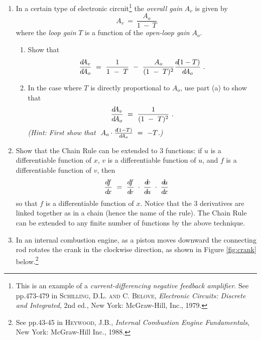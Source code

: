 {\begin{enumerate}[\bfseries 1.]
[{[\bfseries 1.]}]
 \item In a certain type of electronic circuit\footnote{This is an example of a
  \emph{current-differencing negative feedback amplifier}. See pp.473-479 in
  \textsc{Schilling, D.L. and C. Belove}, \emph{Electronic Circuits: Discrete and Integrated},
  2nd ed., New York: McGraw-Hill, Inc., 1979.} the \emph{overall gain} $A_v$ is given by
  \begin{displaymath}
   A_v ~=~ \frac{A_o}{1 ~-~ T}
  \end{displaymath}
  where the \emph{loop gain} $T$ is a function of the \emph{open-loop gain} $A_o$.
  \begin{enumerate}[\bfseries (a)]
   \item Show that
    \begin{displaymath}
     \frac{d \negmedspace A_v}{d\!A_o} ~=~ \frac{1}{1 ~-~ T} ~-~ \frac{A_o}{(1 ~-~ T)^2}
                                           \frac{d \negmedspace (1 - T)}{d\!A_o} ~.
    \end{displaymath}
   \item In the case where $T$ is directly proportional to $A_o$, use part (a) to
    show that
    \begin{displaymath}
     \frac{d \negmedspace A_v}{d\!A_o} ~=~ \frac{1}{(1 ~-~ T)^2} ~.
    \end{displaymath}
    \emph{(Hint: First show that $\;A_o \cdot \frac{d \negmedspace (1 - T)}{d\!A_o} ~=~ -T$.)}
  \end{enumerate}
 \item Show that the Chain Rule can be extended to 3 functions: if $u$ is a
  differentiable function of $x$, $v$ is a differentiable function of $u$, and
  $f$ is a differentiable function of $v$, then
\begin{displaymath}
 \dfdx ~=~ \dfdv \;\cdot\; \dvdu \;\cdot\; \dudx
\end{displaymath}
so that $f$ is a differentiable function of $x$. Notice that the 3 derivatives
are linked together as in a chain (hence the name of the rule). The Chain Rule
can be extended to any finite number of functions by the above technique.
\newpage
 \item In an internal combustion engine, as a piston moves downward the connecting rod
 rotates the crank in the clockwise direction, as shown in Figure \ref{fig:crank}
below.\footnote{See pp.43-45 in \textsc{Heywood, J.B.}, \emph{Internal Combustion Engine
Fundamentals}, New York: McGraw-Hill Inc., 1988.}


\end{enumerate}}
